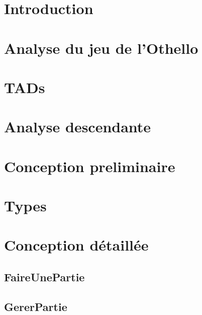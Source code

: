 


  

  \newpage
  \tableofcontents

  \newpage
  \section{Introduction}
    

  \newpage
  \section{Analyse du jeu de l'Othello}
    

  \newpage
  \section{TADs}
    

  \newpage
  \section{Analyse descendante}
    

  \newpage
  \section{Conception preliminaire}
    
    
    

  \newpage
  \section{Types}
    

  \newpage
  \section{Conception détaillée}
    \subsection{FaireUnePartie}
      
    \subsection{GererPartie}
      
